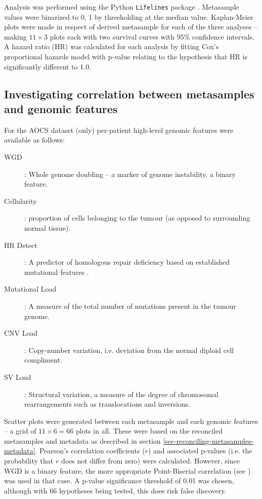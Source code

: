 \documentclass[tikz, 12pt,a4paper,oneside,fleqn]{article}
\begin{document}
Analysis was performed using the Python {\tt Lifelines} package \cite{Davidson-Pilon2020}.  
Metasample values were binarized to 0, 1 by thresholding at the median value.   Kaplan-Meier plots were made in respect of derived metasample for each of the three analyses -- making $11 \times 3$ plots each with two survival curves with 95\% confidence intervals.  A hazard ratio (HR)
was calculated for each analysis by fitting Cox's proportional hazards model with p-value relating to the hypothesis that HR is significantly different to 1.0.


\subsection{Investigating correlation between metasamples and genomic features}
\label{sec-genomic-features}

For the AOCS dataset (only) per-patient high-level genomic features were available as follows:
\begin{description}
\item[WGD]: Whole genome doubling -- a marker of genome instability, a binary feature.
\item[Cellularity]: proportion of cells belonging to the tumour (as opposed to surrounding normal tissue).
\item[HR Detect]: A predictor of homologous repair deficiency based on established mutational features \cite{Ewing2020}.
\item[Mutational Load]: A measure of the total number of mutations present in the tumour genome.
\item[CNV Load]: Copy-number variation, i.e. deviation from the normal diploid cell compliment.
\item[SV Load]: Structural variation, a measure of the degree of chromosomal rearrangements such as translocations and inversions.
\end{description}

Scatter plots were generated between each metasample and each genomic features -- a grid of $11 \times 6 = 66$ plots in all.  These were based on the reconciled metasamples and metadata as described in section \ref{sec-reconciling-metasamples-metadata}.  Pearson's correlation coefficients ($r$) and associated p-values (i.e. the probability that $r$ does not differ from zero) were calculated.   However, since WGD is a binary feature, the more appropriate Point-Biserial correlation (see \cite{Wikipediab}) was used in that case.  A p-value significance threshold of 0.01 was chosen, although with 66 hypotheses being tested, this does risk false discovery.
\end{document}
